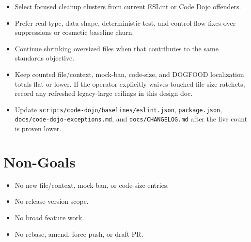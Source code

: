 \begin{itemize}
\tightlist
\item
  Select focused cleanup clusters from current ESLint or Code Dojo offenders.
\item
  Prefer real type, data-shape, deterministic-test, and control-flow fixes over suppressions or cosmetic baseline churn.
\item
  Continue shrinking oversized files when that contributes to the same standards objective.
\item
  Keep counted file/context, mock-ban, code-size, and DOGFOOD localization totals flat or lower. If the operator explicitly waives touched-file size ratchets, record any refreshed legacy-large ceilings in this design doc.
\item
  Update \texttt{s\allowbreak{}c\allowbreak{}r\allowbreak{}i\allowbreak{}p\allowbreak{}t\allowbreak{}s\allowbreak{}/\allowbreak{}c\allowbreak{}o\allowbreak{}d\allowbreak{}e\allowbreak{}-\allowbreak{}d\allowbreak{}o\allowbreak{}j\allowbreak{}o\allowbreak{}/\allowbreak{}b\allowbreak{}a\allowbreak{}s\allowbreak{}e\allowbreak{}l\allowbreak{}i\allowbreak{}n\allowbreak{}e\allowbreak{}s\allowbreak{}/\allowbreak{}e\allowbreak{}s\allowbreak{}l\allowbreak{}i\allowbreak{}n\allowbreak{}t\allowbreak{}.\allowbreak{}j\allowbreak{}s\allowbreak{}o\allowbreak{}n}, \texttt{p\allowbreak{}a\allowbreak{}c\allowbreak{}k\allowbreak{}a\allowbreak{}g\allowbreak{}e\allowbreak{}.\allowbreak{}j\allowbreak{}s\allowbreak{}o\allowbreak{}n}, \texttt{d\allowbreak{}o\allowbreak{}c\allowbreak{}s\allowbreak{}/\allowbreak{}c\allowbreak{}o\allowbreak{}d\allowbreak{}e\allowbreak{}-\allowbreak{}d\allowbreak{}o\allowbreak{}j\allowbreak{}o\allowbreak{}-\allowbreak{}e\allowbreak{}x\allowbreak{}c\allowbreak{}e\allowbreak{}p\allowbreak{}t\allowbreak{}i\allowbreak{}o\allowbreak{}n\allowbreak{}s\allowbreak{}.\allowbreak{}m\allowbreak{}d}, and \texttt{d\allowbreak{}o\allowbreak{}c\allowbreak{}s\allowbreak{}/\allowbreak{}C\allowbreak{}H\allowbreak{}A\allowbreak{}N\allowbreak{}G\allowbreak{}E\allowbreak{}L\allowbreak{}O\allowbreak{}G\allowbreak{}.\allowbreak{}m\allowbreak{}d} after the live count is proven lower.
\end{itemize}

\section{Non-Goals}\label{record-239-non-goals}

\begin{itemize}
\tightlist
\item
  No new file/context, mock-ban, or code-size entries.
\item
  No release-version scope.
\item
  No broad feature work.
\item
  No rebase, amend, force push, or draft PR.
\end{itemize}

